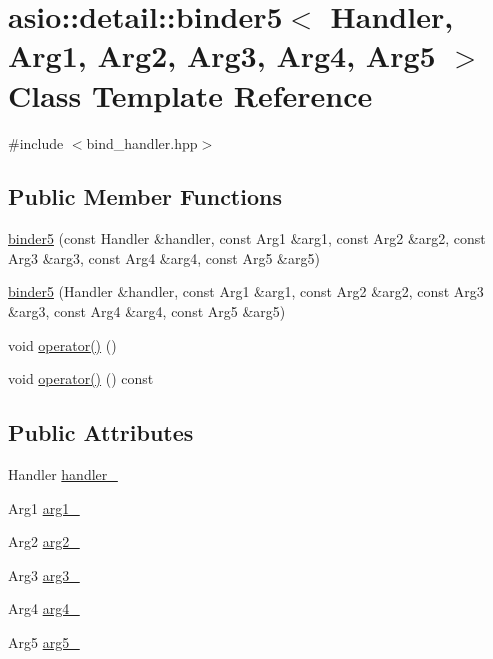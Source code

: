 \hypertarget{classasio_1_1detail_1_1binder5}{}\section{asio\+:\+:detail\+:\+:binder5$<$ Handler, Arg1, Arg2, Arg3, Arg4, Arg5 $>$ Class Template Reference}
\label{classasio_1_1detail_1_1binder5}


{\ttfamily \#include $<$bind\+\_\+handler.\+hpp$>$}

\subsection*{Public Member Functions}
\begin{DoxyCompactItemize}
\item 
\hyperlink{classasio_1_1detail_1_1binder5_a22d2ba2f325ac7a48a0da817ce109c19}{binder5} (const Handler \&handler, const Arg1 \&arg1, const Arg2 \&arg2, const Arg3 \&arg3, const Arg4 \&arg4, const Arg5 \&arg5)
\item 
\hyperlink{classasio_1_1detail_1_1binder5_a038ec22c54f92390e9d4640b885387e2}{binder5} (Handler \&handler, const Arg1 \&arg1, const Arg2 \&arg2, const Arg3 \&arg3, const Arg4 \&arg4, const Arg5 \&arg5)
\item 
void \hyperlink{classasio_1_1detail_1_1binder5_ad966ce26cc08544566381a4908543b50}{operator()} ()
\item 
void \hyperlink{classasio_1_1detail_1_1binder5_a34391c3236545bb1e0353770da9b942b}{operator()} () const 
\end{DoxyCompactItemize}
\subsection*{Public Attributes}
\begin{DoxyCompactItemize}
\item 
Handler \hyperlink{classasio_1_1detail_1_1binder5_a9dd44f3c00833f6ce5971abb8b5c65ee}{handler\+\_\+}
\item 
Arg1 \hyperlink{classasio_1_1detail_1_1binder5_a319c9b9ff436b5be8fe9c165704d9c0c}{arg1\+\_\+}
\item 
Arg2 \hyperlink{classasio_1_1detail_1_1binder5_a28218bc27a6737279e464b94b7ef14f0}{arg2\+\_\+}
\item 
Arg3 \hyperlink{classasio_1_1detail_1_1binder5_a801f94834f9fc7a264e0df6adda829d5}{arg3\+\_\+}
\item 
Arg4 \hyperlink{classasio_1_1detail_1_1binder5_aae101215d4ab2e438ae9b8c05e4146a9}{arg4\+\_\+}
\item 
Arg5 \hyperlink{classasio_1_1detail_1_1binder5_a474dc3cb26a028ffd5fd6477592c64aa}{arg5\+\_\+}
\end{DoxyCompactItemize}


